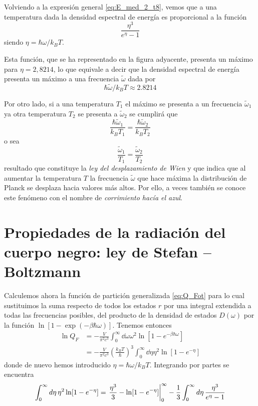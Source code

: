 Volviendo a la expresión general \eqref{eq:E_med_2_t8}, vemos que a una temperatura dada la densidad espectral de energía es proporcional a la función
\begin{equation}
	\frac{\eta^3}{e^{\eta} - 1}
\end{equation}
siendo $\eta = \hbar\omega / k_BT$.

%	
Esta función, que se ha representado en la figura adyacente, presenta un máximo para $\eta = 2,8214$, lo que equivale a decir que la densidad espectral de energía presenta un máximo a una frecuencia $\widetilde{\omega}$ dada por
\begin{equation}
	\hbar\widetilde{\omega}/k_B T \approx 2.8214
\end{equation}

Por otro lado, si a una temperatura $T_1$ el máximo se presenta a un frecuencia $\widetilde{\omega}_1$ ya otra temperatura $T_2$ se presenta a $\widetilde{\omega}_2$ se cumplirá que
\begin{equation}
	\frac{\hbar\widetilde{\omega}_1}{k_B T_1} = \frac{\hbar\widetilde{\omega}_2}{k_B T_2}
\end{equation}
o sea
\begin{equation}
	\frac{\widetilde{\omega}_1}{T_1} = \frac{\widetilde{\omega}_2}{T_2}
\end{equation}
resultado que constituye la \emph{ley del desplazamiento de Wien} y que indica que al aumentar la temperatura $T$ la frecuencia $\widetilde{\omega}$ que hace máxima la distribución de Planck se desplaza hacia valores más altos.
Por ello, a veces también se conoce este fenómeno con el nombre de \emph{corrimiento hacía el azul}.

\section{Propiedades de la radiación del cuerpo negro: ley de Stefan – Boltzmann}

Calculemos ahora la función de partición generalizada \eqref{eq:Q_Fot} para lo cual sustituimos la suma respecto de todos los estados $r$ por una integral extendida a todas las frecuencias posibles, del producto de la densidad de estados $D(\omega)$ por la función $\ln [1 - \exp(-\beta\hbar\omega)]$.
Tenemos entonces
\begin{align}
	\ln Q_F &= -\frac{V}{\pi^2 c^3} \int_0^\infty \dd{\omega} \omega^2 \ln [1 - e^{-\beta\hbar\omega}] \nonumber \\
			&= -\frac{V}{\pi^2 c^3} \left( \frac{k_B T}{\hbar} \right)^3 \int_0^\infty \dd{\eta} \eta^2 \ln [1 - e^{-\eta}]
\end{align}
donde de nuevo hemos introducido $\eta = \hbar\omega / k_BT$.
Integrando por partes se encuentra
\begin{equation}
	\int_0^\infty \dd{\eta} \eta^2 \ln [1 - e^{-\eta}] = \eval{\frac{\eta^3}{3} - \ln [1 - e^{-\eta}]}_{0}^{\infty} - \frac{1}{3} \int_0^\infty \dd{\eta} \frac{\eta^3}{e^{\eta} - 1}
\end{equation}

